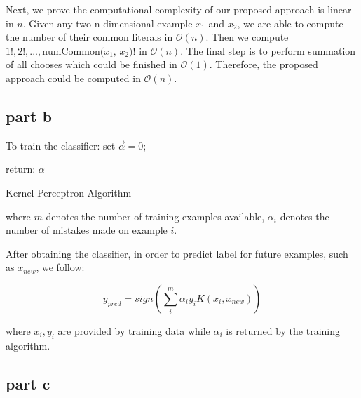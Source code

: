Next, we prove the computational complexity of our proposed approach is linear in $n$. Given any two n-dimensional example $x_1$ and $x_2$, we are able to compute the number of their common literals in $\mathcal{O}(n)$. Then we compute $1!, 2!, ..., \text{numCommon($x_1$, $x_2$)}!$ in $\mathcal{O}(n)$. The final step is to perform summation of all chooses which could be finished in $\mathcal{O}(1)$. Therefore, the proposed approach could be computed in $\mathcal{O}(n)$.


\subsection{part b}
\begin{algorithm}[H]
To train the classifier:
  set $\vec{\alpha}=0$;



return: $\alpha$\;

 \caption{Kernel Perceptron Algorithm}
\end{algorithm}

where $m$ denotes the number of training examples available, $\alpha_i$ denotes the number of mistakes made on example $i$.

After obtaining the classifier, in order to predict label for future examples, such as $x_{new}$, we follow:

\begin{equation}
y_{pred} = sign(\sum_{i}^{m} \alpha_i y_i K(x_i, x_{new}))
\end{equation}

where $x_i, y_i$ are provided by training data while $\alpha_i$ is returned by the training algorithm.

\subsection{part c}











